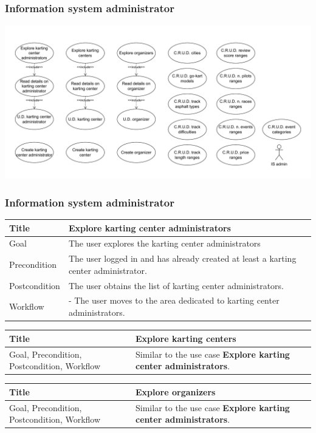 \documentclass{beamer}
\begin{document}
\begin{frame}
    \frametitle{Information system administrator}
    \centering
    \includegraphics[width=0.7\linewidth]{drawio/is-admin.pdf}
\end{frame}

\begin{frame}
    \frametitle{Information system administrator}
    \begin{table}
        \tiny
        \begin{tabular}{|p{2cm}|p{6cm}|}
        \hline  
        Title & \textbf{Explore karting center administrators} \\
        \hline
        Goal & The user explores the karting center administrators \\
        \hline
        Precondition & The user logged in and has already created at least a karting center 
        administrator. \\
        \hline
        Postcondition & The user obtains the list of karting center administrators. \\
        \hline
        Workflow &
        - The user moves to the area dedicated to karting center administrators. \\
        \hline
        \end{tabular}
\end{table}

\begin{table}
    \tiny
    \begin{tabular}{|p{2cm}|p{6cm}|}
    \hline  
    Title & \textbf{Explore karting centers} \\
    \hline
    Goal, Precondition, Postcondition, Workflow & Similar 
    to the use case \textbf{Explore karting center administrators}. \\
    \hline
    \end{tabular}
\end{table}

\begin{table}
    \tiny
    \begin{tabular}{|p{2cm}|p{6cm}|}
    \hline  
    Title & \textbf{Explore organizers} \\
    \hline
    Goal, Precondition, Postcondition, Workflow & Similar 
    to the use case \textbf{Explore karting center administrators}. \\
    \hline
    \end{tabular}
\end{table}
\end{frame}
\end{document}

